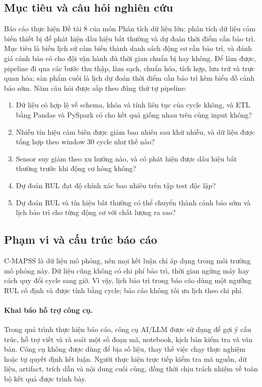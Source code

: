 \subsection{Mục tiêu và câu hỏi nghiên cứu}
Báo cáo thực hiện Đề tài 8 của môn Phân tích dữ liệu lớn: phân tích dữ liệu cảm
biến thiết bị để phát hiện dấu hiệu bất thường và dự đoán thời điểm cần bảo trì.
Mục tiêu là biến lịch sử cảm biến thành danh sách động cơ cần bảo trì, và đánh giá
cảnh báo có cho đội vận hành đủ thời gian chuẩn bị hay không. Để làm được, pipeline
đi qua các bước thu thập, làm sạch, chuẩn hóa, tích hợp, lưu trữ và trực quan hóa;
sản phẩm cuối là lịch dự đoán thời điểm cần bảo trì kèm biểu đồ cảnh báo sớm. Năm câu hỏi được
sắp theo đúng thứ tự pipeline:
\begin{enumerate}[label=\textbf{Q\arabic*.},leftmargin=2.6em]
\item Dữ liệu có hợp lệ về schema, khóa và tính liên tục của cycle không, và ETL
      bằng Pandas và PySpark có cho kết quả giống nhau trên cùng input không?
\item Nhiễu tín hiệu cảm biến được giảm bao nhiêu sau khử nhiễu, và dữ liệu được
      tổng hợp theo window 30 cycle như thế nào?
\item Sensor suy giảm theo xu hướng nào, và có phát hiện được dấu hiệu bất thường
      trước khi động cơ hỏng không?
\item Dự đoán RUL đạt độ chính xác bao nhiêu trên tập test độc lập?
\item Dự đoán RUL và tín hiệu bất thường có thể chuyển thành cảnh báo sớm và
      lịch bảo trì cho từng động cơ với chất lượng ra sao?
\end{enumerate}

\subsection{Phạm vi và cấu trúc báo cáo}
C-MAPSS là dữ liệu mô phỏng, nên mọi kết luận chỉ áp dụng trong môi trường mô
phỏng này. Dữ liệu cũng không có chi phí bảo trì, thời gian ngừng máy hay cách quy
đổi cycle sang giờ. Vì vậy, lịch bảo trì trong báo cáo dùng một ngưỡng RUL cố định
và được tính bằng cycle; báo cáo không tối ưu lịch theo chi phí.

\paragraph{Khai báo hỗ trợ công cụ.} Trong quá trình thực hiện báo cáo, công cụ
AI/LLM được sử dụng để gợi ý cấu trúc, hỗ trợ viết và rà soát một số đoạn mã,
notebook, kịch bản kiểm tra và văn bản. Công cụ không được dùng để bịa số liệu,
thay thế việc chạy thực nghiệm hoặc tự quyết định kết luận. Người thực hiện trực
tiếp kiểm tra mã nguồn, dữ liệu, artifact, trích dẫn và nội dung cuối cùng, đồng
thời chịu trách nhiệm về toàn bộ kết quả được trình bày.

